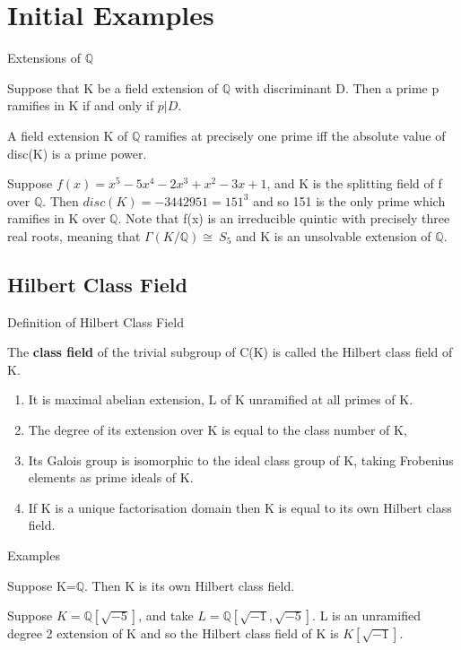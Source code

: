 \documentclass[10pt]{beamer}
\begin{document}
\section{Initial Examples}
\begin{frame}{Extensions of $\mathbb{Q}$}
    \begin{theorem}
     Suppose that K be a field extension of $\mathbb{Q}$ with discriminant D. Then a prime p
ramifies in K if and only if $p|D$.   
    \end{theorem}
    \begin{corollary}
A field extension K of $\mathbb{Q}$ ramifies at precisely one prime iff the absolute value of disc(K) is a prime power.
\end{corollary}
\begin{example}
    Suppose $f(x)=x^5-5x^4-2x^3+x^2-3x+1$, and K is the splitting field of f over $\mathbb{Q}$. Then $disc(K)=-3442951=151^3$ and so 151 is the only prime which ramifies in K over $\mathbb{Q}$. Note that f(x) is an irreducible quintic with precisely three real roots, meaning that $\Gamma(K/\mathbb{Q})\cong\ S_5$ and K is an unsolvable extension of $\mathbb{Q}$.
\end{example}
\end{frame}
\subsection{Hilbert Class Field}
\begin{frame}{Definition of Hilbert Class Field}
    \begin{definition}
The \textbf{class field} of the trivial subgroup of C(K) is called the Hilbert class field of K. 
\end{definition}
\begin{enumerate}
    \item It is maximal abelian extension, L of K unramified at all primes of K. 
    \item  The degree of its extension over K is equal to the class number of K, 
    \item Its Galois group is isomorphic to the ideal class group of K, taking Frobenius elements as prime ideals of K.
    \item If K is a unique factorisation domain then K is equal to its own Hilbert class field. 
\end{enumerate}
\end{frame}
\begin{frame}{Examples}
    \begin{example}
    Suppose K=$\mathbb{Q}$. Then K is its own Hilbert class field. 
\end{example}
\begin{example}
    Suppose $K=\mathbb{Q}[\sqrt{-5}]$, and take $L=\mathbb{Q}[\sqrt{-1},\sqrt{-5}]$. L is an unramified degree 2 extension of K and so the Hilbert class field of K is $K[\sqrt{-1}]$.
\end{example}
\end{frame}
\end{document}
